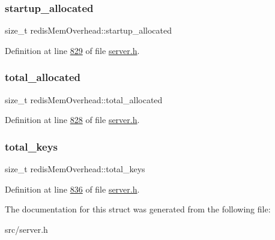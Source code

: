 \mbox{\label{structredisMemOverhead_a7f07b8760af724076725e6f9fd2ea391}} 
\subsubsection{\texorpdfstring{startup\+\_\+allocated}{startup\_allocated}}
{\footnotesize\ttfamily size\+\_\+t redis\+Mem\+Overhead\+::startup\+\_\+allocated}



Definition at line \hyperlink{server_8h_source_l00829}{829} of file \hyperlink{server_8h_source}{server.\+h}.

\mbox{\label{structredisMemOverhead_a67ecdc7c9827ccc1c4a08e9be4d0bf31}} 
\subsubsection{\texorpdfstring{total\+\_\+allocated}{total\_allocated}}
{\footnotesize\ttfamily size\+\_\+t redis\+Mem\+Overhead\+::total\+\_\+allocated}



Definition at line \hyperlink{server_8h_source_l00828}{828} of file \hyperlink{server_8h_source}{server.\+h}.

\mbox{\label{structredisMemOverhead_a6d4d8c28242b3a0b0ed18a3a12c08cc4}} 
\subsubsection{\texorpdfstring{total\+\_\+keys}{total\_keys}}
{\footnotesize\ttfamily size\+\_\+t redis\+Mem\+Overhead\+::total\+\_\+keys}



Definition at line \hyperlink{server_8h_source_l00836}{836} of file \hyperlink{server_8h_source}{server.\+h}.



The documentation for this struct was generated from the following file\+:\begin{DoxyCompactItemize}
\item 
src/server.\+h\end{DoxyCompactItemize}
